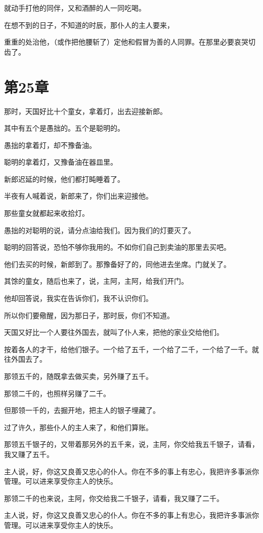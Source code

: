 \documentclass[12pt,oneside]{book}
\begin{document}
就动手打他的同伴，又和酒醉的人一同吃喝。

在想不到的日子，不知道的时辰，那仆人的主人要来，

重重的处治他，（或作把他腰斩了）定他和假冒为善的人同罪。在那里必要哀哭切齿了。

\chapter{第25章}
那时，天国好比十个童女，拿着灯，出去迎接新郎。

其中有五个是愚拙的。五个是聪明的。

愚拙的拿着灯，却不豫备油。

聪明的拿着灯，又豫备油在器皿里。

新郎迟延的时候，他们都打盹睡着了。

半夜有人喊着说，新郎来了，你们出来迎接他。

那些童女就都起来收拾灯。

愚拙的对聪明的说，请分点油给我们。因为我们的灯要灭了。

聪明的回答说，恐怕不够你我用的。不如你们自己到卖油的那里去买吧。

他们去买的时候，新郎到了。那豫备好了的，同他进去坐席。门就关了。

其馀的童女，随后也来了，说，主阿，主阿，给我们开门。

他却回答说，我实在告诉你们，我不认识你们。

所以你们要儆醒，因为那日子，那时辰，你们不知道。

天国又好比一个人要往外国去，就叫了仆人来，把他的家业交给他们。

按着各人的才干，给他们银子。一个给了五千，一个给了二千，一个给了一千。就往外国去了。

那领五千的，随既拿去做买卖，另外赚了五千。

那领二千的，也照样另赚了二千。

但那领一千的，去掘开地，把主人的银子埋藏了。

过了许久，那些仆人的主人来了，和他们算账。

那领五千银子的，又带着那另外的五千来，说，主阿，你交给我五千银子，请看，我又赚了五千。

主人说，好，你这又良善又忠心的仆人。你在不多的事上有忠心，我把许多事派你管理。可以进来享受你主人的快乐。

那领二千的也来说，主阿，你交给我二千银子，请看，我又赚了二千。

主人说，好，你这又良善又忠心的仆人。你在不多的事上有忠心，我把许多事派你管理。可以进来享受你主人的快乐。
\end{document}
